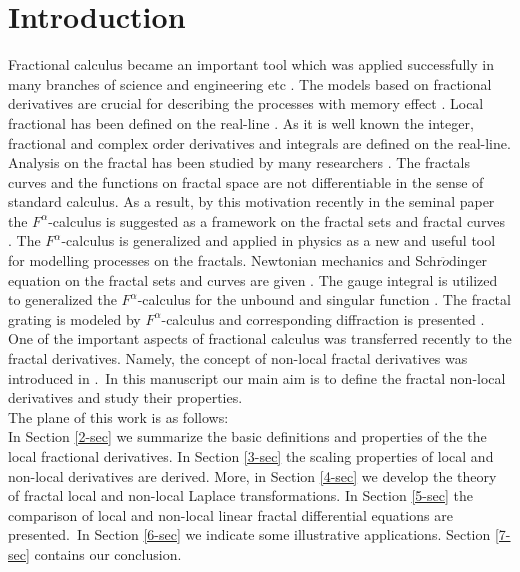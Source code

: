 \documentclass[12pt]{article}
\begin{document}

\section{Introduction}
 Fractional calculus became an important tool which was applied successfully in many branches of science and engineering etc \cite{ab1,ab2,ab3,ab4,ab5}. The models based on fractional derivatives are crucial for describing the processes with memory effect \cite{ab6}. Local fractional has been defined on the real-line \cite{ab7}. As it is well known the integer, fractional and complex order derivatives and integrals are defined on the real-line. Analysis on the fractal has been studied by many researchers \cite{ab9,ab10,ab11}. The fractals curves and the functions on fractal space are not differentiable in the sense of  standard calculus. As a result, by this motivation  recently in the seminal paper the $F^{\alpha}$-calculus is suggested as a framework on the fractal sets and fractal curves \cite{ab12,ab13,ab14,ab15}. The $F^{\alpha}$-calculus is generalized and applied in physics as a new and useful tool for modelling   processes on the fractals. Newtonian mechanics and Schr$\ddot{o}$dinger equation on the fractal sets and curves are given \cite{ab16,ab17,ab18}. The gauge integral is utilized to generalized the $F^{\alpha}$-calculus for the unbound and singular function \cite{ab19}. The fractal grating is modeled by $F^{\alpha}$-calculus and corresponding diffraction is presented  \cite{ab19}. One of the important aspects of fractional calculus was transferred recently to the fractal derivatives. Namely, the concept of non-local fractal derivatives was introduced in \cite{Golmankhaneh-107-k}.~In this manuscript our main aim is to define the fractal non-local derivatives and study their properties.\\
The plane of this work is as follows:\\
In  Section \ref{2-sec} we summarize the basic definitions and properties of the the local fractional derivatives. In  Section \ref{3-sec} the scaling properties of local and non-local derivatives are derived. More, in Section \ref{4-sec} we develop the theory of fractal local and non-local  Laplace transformations. In Section  \ref{5-sec} the comparison of local and non-local linear fractal differential equations  are presented.~In Section \ref{6-sec} we indicate  some illustrative  applications. Section  \ref{7-sec} contains our conclusion.
\end{document}
